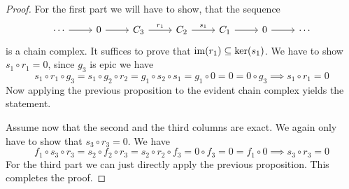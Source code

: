 \begin{proof}[Proof]
    For the first part we will have to show, that the sequence 
    \[\begin{tikzcd}
        \cdots & 0 & {C_3} & {C_2} & {C_1} & 0 & \cdots
        \arrow[from=1-1, to=1-2]
        \arrow[from=1-2, to=1-3]
        \arrow["{r_1}", from=1-3, to=1-4]
        \arrow["{s_1}", from=1-4, to=1-5]
        \arrow[from=1-5, to=1-6]
        \arrow[from=1-6, to=1-7]
    \end{tikzcd}\]
    is a chain complex. It suffices to prove that $\text{im}(r_1)\subseteq\ker(s_1)$.
    We have to show $s_1\circ r_1 = 0$, since $g_3$ is epic we have 
    \[
        s_1\circ r_1\circ g_3 = s_1\circ g_2\circ r_2 = g_1\circ s_2\circ s_1 = g_1 \circ 0 = 0 = 0\circ g_3 \implies s_1\circ r_1 = 0
    \]
    Now applying the previous proposition to the evident chain complex yields the statement.\par
    Assume now that the second and the third columns are exact. We again only have to show that 
    $s_3\circ r_3 = 0$. We have 
    \[
    f_1\circ s_3\circ r_3 = s_2 \circ f_2 \circ r_3 = s_2 \circ r_2 \circ f_3 = 0\circ f_3 = 0 = f_1\circ 0 \implies s_3\circ r_3 = 0
    \]
    For the third part we can just directly apply the previous proposition. This completes the proof.
\end{proof}